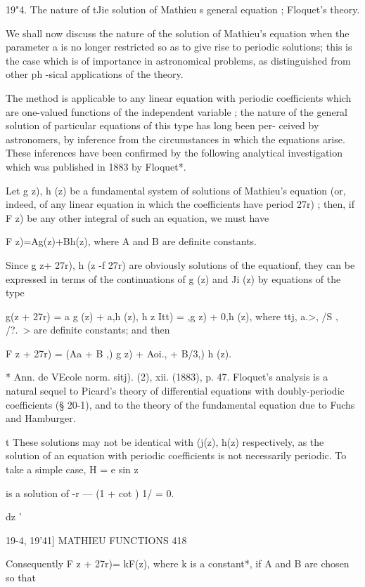 19"4. The nature of tJie solution of Mathieu s general equation ; Floquet's 
theory. 

We shall now discuss the nature of the solution of Mathieu's equation 
when the parameter a is no longer restricted so as to give rise to periodic 
solutions; this is the case which is of importance in astronomical problems, as 
distinguished from other ph -sical applications of the theory. 

The method is applicable to any linear equation with periodic coefficients 
which are one-valued functions of the independent variable ; the nature of 
the general solution of particular equations of this type has long been per- 
ceived by astronomers, by inference from the circumstances in which the 
equations arise. These inferences have been confirmed by the following 
analytical investigation which was published in 1883 by Floquet*. 

Let g z), h (z) be a fundamental system of solutions of Mathieu's equation 
(or, indeed, of any linear equation in which the coefficients have period 27r) ; 
then, if F z) be any other integral of such an equation, we must have 

F z)=Ag(z)+Bh(z), 
where A and B are definite constants. 

Since g  z+ 27r), h (z -f 27r) are obviously solutions of the equationf, they 
can be expressed in terms of the continuations of g (z) and Ji (z) by equations 
of the type 

g(z + 27r) = a g (z) + a,h (z), h  z   Itt) =  ,g  z) + 0,h (z), 
where ttj, a.>, /S , /?.\ > are definite constants; and then 

F z + 27r) = (Aa  + B ,) g  z) +  Aoi., + B/3,) h (z). 

* Ann. de VEcole norm. sitj). (2), xii. (1883), p. 47. Floquet's analysis is a natural sequel 
to Picard's theory of differential equations with doubly-periodic coefficients (§ 20-1), and to the 
theory of the fundamental equation due to Fuchs and Hamburger. 

t These solutions may not be identical with (j(z), h(z) respectively, as the solution of an 
equation with periodic coefficients is not necessarily periodic. To take a simple case, H = e sin z 

is a solution of -r — (1 + cot  ) 1/ = 0. 

dz   ' 



19-4, 19'41] MATHIEU FUNCTIONS 418 

Consequently F z + 27r)= kF(z), where k is a constant*, if A and B are 
chosen so that 

